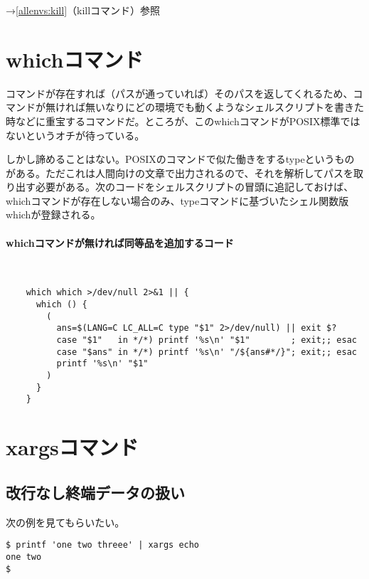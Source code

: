 \noindent
→\ref{allenvs:kill}（killコマンド）参照


\section{whichコマンド}
\label{allenvs:which}

コマンドが存在すれば（パスが通っていれば）そのパスを返してくれるため、コマンドが無ければ無いなりにどの環境でも動くようなシェルスクリプトを書きた時などに重宝するコマンドだ。ところが、このwhichコマンドがPOSIX標準ではないというオチが待っている。

しかし諦めることはない。POSIXのコマンドで似た働きをするtypeというものがある。ただこれは人間向けの文章で出力されるので、それを解析してパスを取り出す必要がある。次のコードをシェルスクリプトの冒頭に追記しておけば、whichコマンドが存在しない場合のみ、typeコマンドに基づいたシェル関数版whichが登録される。

\paragraph{whichコマンドが無ければ同等品を追加するコード} 　\\
\begin{frameboxit}{160.0mm}
\begin{verbatim}
	which which >/dev/null 2>&1 || {
	  which () {
	    (
	      ans=$(LANG=C LC_ALL=C type "$1" 2>/dev/null) || exit $?
	      case "$1"   in */*) printf '%s\n' "$1"        ; exit;; esac
	      case "$ans" in */*) printf '%s\n' "/${ans#*/}"; exit;; esac
	      printf '%s\n' "$1"
	    )
	  }
	}
\end{verbatim}
\end{frameboxit}


\section{xargsコマンド}
\label{allenvs:xargs}

\subsection*{改行なし終端データの扱い}

次の例を見てもらいたい。

\begin{screen}
	\verb!$ printf 'one two threee' | xargs echo! \return \\
	\verb|one two|                                        \\
	\verb|$ |
\end{screen}

